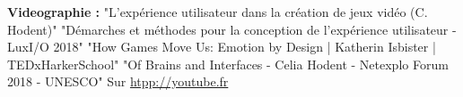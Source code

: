 \documentclass[11pt]{article}
\begin{document}
\hspace*{-1cm}
\Large{\textbf{Videographie :}}\newline
	"L'expérience utilisateur dans la création de jeux vidéo (C. Hodent)"\newline
	"Démarches et méthodes pour la conception de l'expérience utilisateur - LuxI/O 2018"\newline
	"How Games Move Us: Emotion by Design | Katherin Isbister | TEDxHarkerSchool"\newline
	"Of Brains and Interfaces - Celia Hodent - Netexplo  Forum 2018 - UNESCO"
	Sur \href{http://youtube.fr}{htpp://youtube.fr}\par

\newpage
\appendix
\renewcommand{\appendixpagename}{Annexes}\appendixpage
%	
\end{document}
